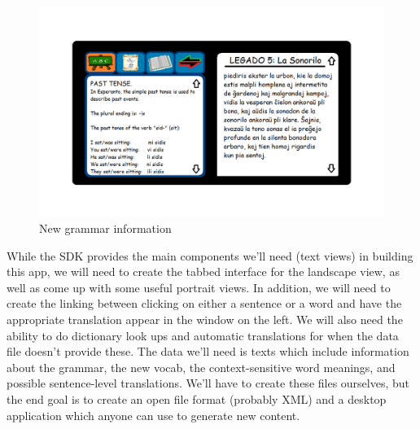 \documentclass[11pt]{article}
\begin{document}
\begin{figure}[h]
  \caption{New grammar information}
  \label{grammar}
  \includegraphics[scale=.5]{grammar_tab.png}
\end{figure}

While the SDK provides the main components we'll need (text views) in building this app, we will need to create the tabbed interface for the landscape view, as well as come up with some useful portrait views. In addition, we will need to create the linking between clicking on either a sentence or a word and have the appropriate translation appear in the window on the left.  We will also need the ability to do dictionary look ups and automatic translations for when the data file doesn't provide these. The data we'll need is texts which include information about the grammar, the new vocab, the context-sensitive word meanings, and possible sentence-level translations. We'll have to create these files ourselves, but the end goal is to create an open file format (probably XML) and a desktop application which anyone can use to generate new content.
\end{document}
